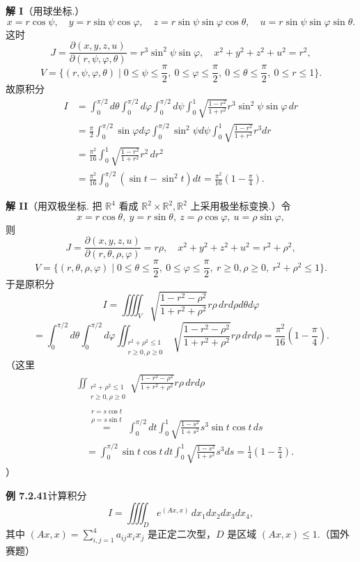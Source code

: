 \documentclass[UTF8,12pt,a4paper,fontset=fandol]{ctexart}
\providecommand{\xlongequal}[1]{\overset{#1}{=}}
\begin{document}
\noindent\textbf{解 I}\quad （用球坐标.）
\[
x=r\cos\psi,\quad y=r\sin\psi\cos\varphi,\quad
z=r\sin\psi\sin\varphi\cos\theta,\quad
u=r\sin\psi\sin\varphi\sin\theta.
\]
这时
\[
J=\frac{\partial(x,y,z,u)}{\partial(r,\psi,\varphi,\theta)}
=r^3\sin^2\psi\sin\varphi,\quad
x^2+y^2+z^2+u^2=r^2,
\]
\[
V=\{(r,\psi,\varphi,\theta)\mid 0\le\psi\le\frac\pi2,\ 0\le\varphi\le\frac\pi2,\ 0\le\theta\le\frac\pi2,\ 0\le r\le1\}.
\]
故原积分
\[
\begin{aligned}
I&=\int_0^{\pi/2}d\theta\int_0^{\pi/2}d\varphi
\int_0^{\pi/2}d\psi\int_0^1
\sqrt{\frac{1-r^2}{1+r^2}}r^3\sin^2\psi\sin\varphi\,dr\\
&=\frac\pi2\int_0^{\pi/2}\sin\varphi d\varphi
\int_0^{\pi/2}\sin^2\psi d\psi
\int_0^1\sqrt{\frac{1-r^2}{1+r^2}}r^3dr\\
&=\frac{\pi^2}{16}\int_0^1\sqrt{\frac{1-r^2}{1+r^2}}r^2\,d r^2\\
&=\frac{\pi^2}{16}\int_0^{\pi/2}(\sin t-\sin^2t)dt
=\frac{\pi^2}{16}\left(1-\frac\pi4\right).
\end{aligned}
\]

\noindent\textbf{解 II}\quad （用双极坐标. 把 $\mathbb R^4$ 看成 $\mathbb R^2\times\mathbb R^2,\mathbb R^2$ 上采用极坐标变换.）令
\[
x=r\cos\theta,\ y=r\sin\theta,\ z=\rho\cos\varphi,\ u=\rho\sin\varphi,
\]
则
\[
J=\frac{\partial(x,y,z,u)}{\partial(r,\theta,\rho,\varphi)}
=r\rho,\quad x^2+y^2+z^2+u^2=r^2+\rho^2,
\]
\[
V=\{(r,\theta,\rho,\varphi)\mid 0\le\theta\le\frac\pi2,\ 0\le\varphi\le\frac\pi2,\ r\ge0,\rho\ge0,\ r^2+\rho^2\le1\}.
\]
于是原积分
\[
I=\iiiint_V\sqrt{\frac{1-r^2-\rho^2}{1+r^2+\rho^2}}r\rho\,drd\rho d\theta d\varphi
\]
\[
=\int_0^{\pi/2}d\theta\int_0^{\pi/2}d\varphi
\iint_{\substack{r^2+\rho^2\le1\\r\ge0,\rho\ge0}}
\sqrt{\frac{1-r^2-\rho^2}{1+r^2+\rho^2}}r\rho\,drd\rho
=\frac{\pi^2}{16}\left(1-\frac\pi4\right).
\]
（这里
\[
\begin{aligned}
&\iint_{\substack{r^2+\rho^2\le1\\r\ge0,\rho\ge0}}
\sqrt{\frac{1-r^2-\rho^2}{1+r^2+\rho^2}}r\rho\,drd\rho\\
&\quad\xlongequal{\substack{r=s\cos t\\\rho=s\sin t}}
\int_0^{\pi/2}dt\int_0^1
\sqrt{\frac{1-s^2}{1+s^2}}s^3\sin t\cos t\,ds\\
&\quad=\int_0^{\pi/2}\sin t\cos t\,dt
\int_0^1\sqrt{\frac{1-s^2}{1+s^2}}s^3ds
=\frac14\left(1-\frac\pi4\right).
\end{aligned}
\]
）

\noindent\textbf{例 7.2.41}\quad 计算积分
\[
I=\iiiint_D e^{(Ax,x)}\,dx_1dx_2dx_3dx_4,
\]
其中 $(Ax,x)=\displaystyle\sum_{i,j=1}^4a_{ij}x_ix_j$ 是正定二次型，$D$ 是区域 $(Ax,x)\le1$.（国外赛题）
\end{document}
